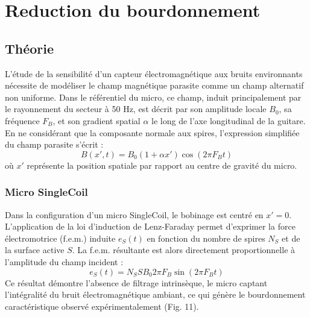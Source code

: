 \documentclass[11pt, a4paper]{article}
\begin{document}
\newpage
\section{Reduction du bourdonnement}

\subsection{Théorie}
L'étude de la sensibilité d'un capteur électromagnétique aux bruits environnants nécessite de modéliser le champ magnétique parasite comme un champ alternatif non uniforme. Dans le référentiel du micro, ce champ, induit principalement par le rayonnement du secteur à 50 Hz, est décrit par son amplitude locale $B_0$, sa fréquence $F_B$, et son gradient spatial $\alpha$ le long de l'axe longitudinal de la guitare. En ne considérant que la composante normale aux spires, l'expression simplifiée du champ parasite s'écrit :
\begin{equation}
B(x',t) = B_0(1 + \alpha x') \cos(2\pi F_B t)
\end{equation}
où $x'$ représente la position spatiale par rapport au centre de gravité du micro.

\subsubsection{Micro SingleCoil}
Dans la configuration d'un micro SingleCoil, le bobinage est centré en $x' = 0$. L'application de la loi d'induction de Lenz-Faraday permet d'exprimer la force électromotrice (f.e.m.) induite $e_S(t)$ en fonction du nombre de spires $N_S$ et de la surface active $S$. La f.e.m. résultante est alors directement proportionnelle à l'amplitude du champ incident :
\begin{equation}
e_S(t) = N_S S B_0 2\pi F_B \sin(2\pi F_B t)
\end{equation}
Ce résultat démontre l'absence de filtrage intrinsèque, le micro captant l'intégralité du bruit électromagnétique ambiant, ce qui génère le bourdonnement caractéristique observé expérimentalement (Fig. 11).
\end{document}
